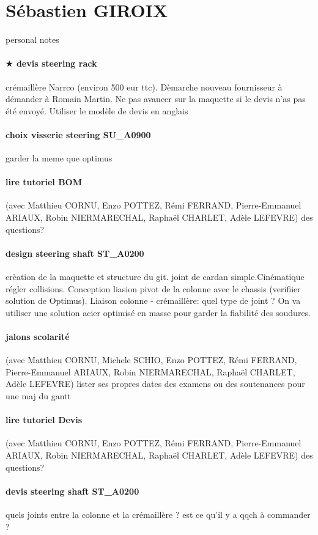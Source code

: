 
 
 \newpage \section*{Sébastien GIROIX} 
 \par personal notes
\paragraph{$\bigstar$ devis steering rack} crémaillère Narrco (environ 500 eur ttc). Dèmarche nouveau fournisseur à démander à Romain Martin. Ne pas avancer sur la maquette si le devis n'as pas été envoyé. Utiliser le modèle de devis en anglais
\paragraph{choix visserie steering SU\_A0900} garder la meme que optimus
\paragraph{lire tutoriel BOM} (avec Matthieu CORNU, Enzo POTTEZ, Rémi FERRAND, Pierre-Emmanuel ARIAUX, Robin NIERMARECHAL, Raphaël CHARLET, Adèle LEFEVRE) des questions?
\paragraph{design steering shaft ST\_A0200} crèation de la maquette et structure du git. joint de cardan simple.Cinématique régler collisions. Conception liasion pivot de la colonne avec le chassis (verifiier solution de Optimus). Liaison colonne - crémaillère: quel type de joint ? On va utiliser une solution acier optimisé en masse pour garder la fiabilité des soudures.
\paragraph{jalons scolarité} (avec Matthieu CORNU, Michele SCHIO, Enzo POTTEZ, Rémi FERRAND, Pierre-Emmanuel ARIAUX, Robin NIERMARECHAL, Raphaël CHARLET, Adèle LEFEVRE) lister ses propres dates des examens ou des soutenances pour une maj du gantt
\paragraph{lire tutoriel Devis} (avec Matthieu CORNU, Enzo POTTEZ, Rémi FERRAND, Pierre-Emmanuel ARIAUX, Robin NIERMARECHAL, Raphaël CHARLET, Adèle LEFEVRE) des questions?
\paragraph{devis steering shaft ST\_A0200} quels joints entre la colonne et la crémaillère ? est ce qu'il y a qqch à commander ?
